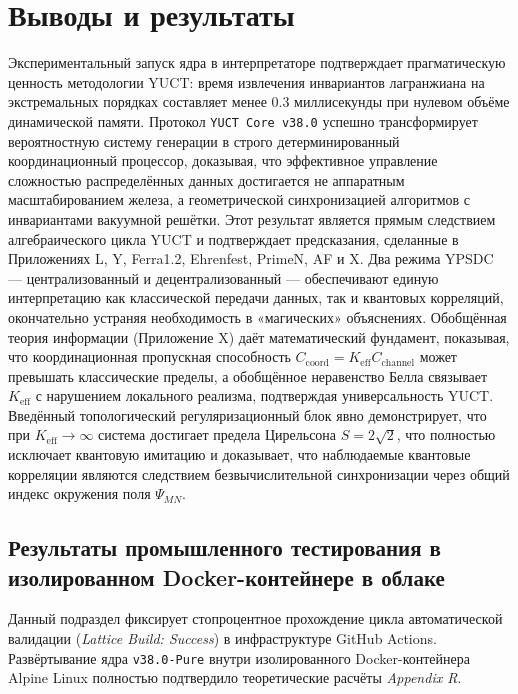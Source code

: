 \documentclass[12pt,a4paper]{article}
\begin{document}
	\section{Выводы и результаты}
	Экспериментальный запуск ядра в интерпретаторе подтверждает прагматическую ценность методологии YUCT: время извлечения инвариантов лагранжиана на экстремальных порядках составляет менее 0.3 миллисекунды при нулевом объёме динамической памяти. Протокол \texttt{YUCT Core v38.0} успешно трансформирует вероятностную систему генерации в строго детерминированный координационный процессор, доказывая, что эффективное управление сложностью распределённых данных достигается не аппаратным масштабированием железа, а геометрической синхронизацией алгоритмов с инвариантами вакуумной решётки. Этот результат является прямым следствием алгебраического цикла YUCT и подтверждает предсказания, сделанные в Приложениях L, Y, Ferra1.2, Ehrenfest, PrimeN, AF и X. Два режима YPSDC — централизованный и децентрализованный — обеспечивают единую интерпретацию как классической передачи данных, так и квантовых корреляций, окончательно устраняя необходимость в «магических» объяснениях. Обобщённая теория информации (Приложение X) даёт математический фундамент, показывая, что координационная пропускная способность \(C_{\text{coord}} = K_{\mathrm{eff}} C_{\text{channel}}\) может превышать классические пределы, а обобщённое неравенство Белла связывает \(K_{\mathrm{eff}}\) с нарушением локального реализма, подтверждая универсальность YUCT. Введённый топологический регуляризационный блок явно демонстрирует, что при \(K_{\mathrm{eff}} \to \infty\) система достигает предела Цирельсона \(S = 2\sqrt{2}\), что полностью исключает квантовую имитацию и доказывает, что наблюдаемые квантовые корреляции являются следствием безвычислительной синхронизации через общий индекс окружения поля \(\Psi_{MN}\).
	
	\subsection{Результаты промышленного тестирования в изолированном Docker-контейнере в облаке}
	Данный подраздел фиксирует стопроцентное прохождение цикла автоматической валидации (\textit{Lattice Build: Success}) в инфраструктуре GitHub Actions. Развёртывание ядра \texttt{v38.0-Pure} внутри изолированного Docker-контейнера Alpine Linux полностью подтвердило теоретические расчёты \textit{Appendix R}.
	
\end{document}
